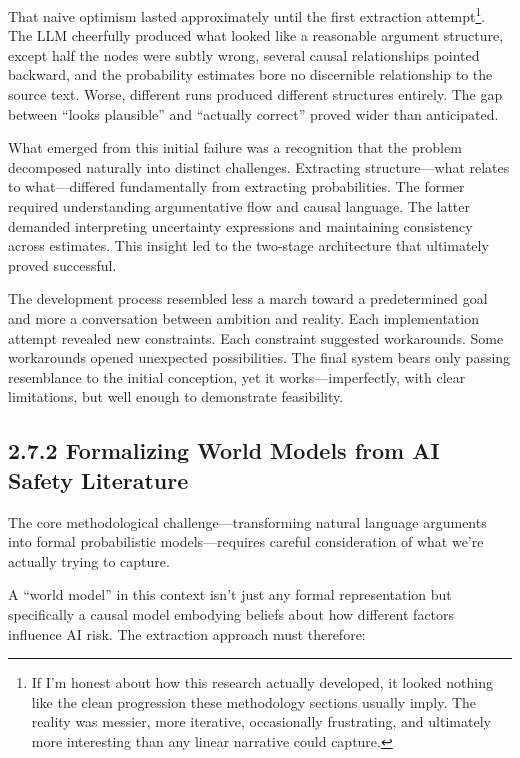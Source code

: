 \documentclass[
  11pt,
  letterpaper,
  openany]{book}
\begin{document}
That naive optimism lasted approximately until the first extraction
attempt\footnote{If I'm honest about how this research actually
  developed, it looked nothing like the clean progression these
  methodology sections usually imply. The reality was messier, more
  iterative, occasionally frustrating, and ultimately more interesting
  than any linear narrative could capture.}. The LLM cheerfully produced
what looked like a reasonable argument structure, except half the nodes
were subtly wrong, several causal relationships pointed backward, and
the probability estimates bore no discernible relationship to the source
text. Worse, different runs produced different structures entirely. The
gap between ``looks plausible'' and ``actually correct'' proved wider
than anticipated.

What emerged from this initial failure was a recognition that the
problem decomposed naturally into distinct challenges. Extracting
structure---what relates to what---differed fundamentally from
extracting probabilities. The former required understanding
argumentative flow and causal language. The latter demanded interpreting
uncertainty expressions and maintaining consistency across estimates.
This insight led to the two-stage architecture that ultimately proved
successful.

The development process resembled less a march toward a predetermined
goal and more a conversation between ambition and reality. Each
implementation attempt revealed new constraints. Each constraint
suggested workarounds. Some workarounds opened unexpected possibilities.
The final system bears only passing resemblance to the initial
conception, yet it works---imperfectly, with clear limitations, but well
enough to demonstrate feasibility.

\subsection{2.7.2 Formalizing World Models from AI Safety
Literature}\label{sec-formalizing-world-models}

The core methodological challenge---transforming natural language
arguments into formal probabilistic models---requires careful
consideration of what we're actually trying to capture.

A ``world model'' in this context isn't just any formal representation
but specifically a causal model embodying beliefs about how different
factors influence AI risk. The extraction approach must therefore:
\end{document}

